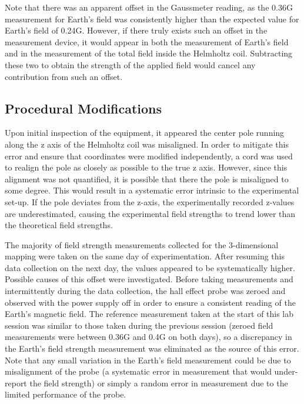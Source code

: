 \documentclass[a4paper]{article}
\begin{document}
\qq Note that there was an apparent offset in the Gaussmeter reading, as the 0.36G
measurement for Earth's field was consistently higher than the expected value
for Earth's field of 0.24G. However, if there truly exists such an offset in the
measurement device, it would appear in both the measurement of Earth's field and
in the measurement of the total field inside the Helmholtz coil. Subtracting
these two to obtain the strength of the applied field would cancel any
contribution from such an offset.


\subsection{Procedural Modifications}

\qq Upon initial inspection of the equipment, it appeared the center pole running
along the z axis of the Helmholtz coil was misaligned. In order to mitigate this
error and ensure that coordinates were modified independently, a cord was used
to realign the pole as closely as possible to the true z axis. However, since
this alignment was not quantified, it is possible that there the pole is
misaligned to some degree. This would result in a systematic error intrinsic to
the experimental set-up. If the pole deviates from the z-axis, the
experimentally recorded z-values are underestimated, causing the experimental
field strengths to trend lower than the theoretical field strengths.

\qq The majority of field strength measurements collected for the 3-dimensional
mapping were taken on the same day of experimentation. After resuming this data
collection on the next day, the values appeared to be systematically
higher. Possible causes of this offset were investigated. Before taking
measurements and intermittently during the data collection, the hall effect
probe was zeroed and observed with the power supply off in order to ensure a
consistent reading of the Earth's magnetic field. The reference measurement
taken at the start of this lab session was similar to those taken during the
previous session (zeroed field measurements were between 0.36G and 0.4G on both
days), so a discrepancy in the Earth's field strength measurement was eliminated
as the source of this error. Note that any small variation in the Earth's field
measurement could be due to misalignment of the probe (a systematic error in
measurement that would under-report the field strength) or simply a random error
in measurement due to the limited performance of the probe.
\end{document}

